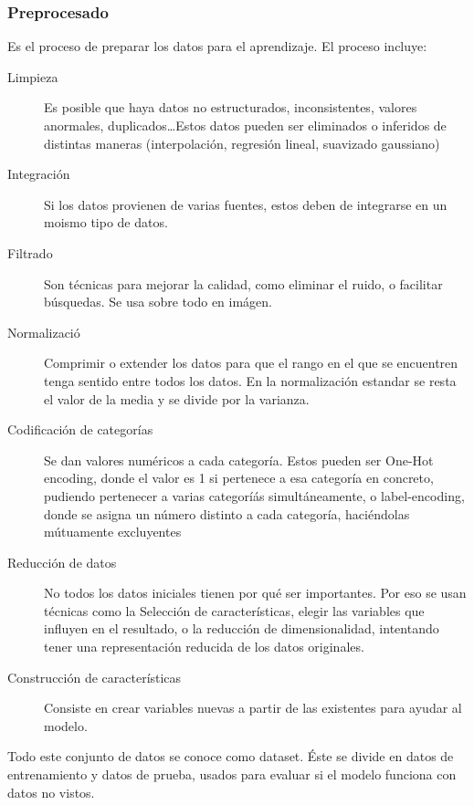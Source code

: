     \subsubsection{Preprocesado}
        Es el proceso de preparar los datos para el aprendizaje. El proceso incluye:
        \begin{description}
            \item[Limpieza] Es posible que haya datos no estructurados, inconsistentes, valores anormales, duplicados\dots Estos datos pueden ser eliminados o inferidos de distintas maneras (interpolación, regresión lineal, suavizado gaussiano)
            \item[Integración] Si los datos provienen de varias fuentes, estos deben de integrarse en un moismo tipo de datos.
            \item[Filtrado] Son técnicas para mejorar la calidad, como eliminar el ruido, o facilitar búsquedas. Se usa sobre todo en imágen.
            \item[Normalizació] Comprimir o extender los datos para que el rango en el que se encuentren tenga sentido entre todos los datos. En la normalización estandar se resta el valor de la media y se divide por la varianza.
            \item [Codificación de categorías] Se dan valores numéricos a cada categoría. Estos pueden ser One-Hot encoding, donde el valor es 1 si pertenece a esa categoría en concreto, pudiendo pertenecer a varias categoríás simultáneamente, o label-encoding, donde se asigna un número distinto a cada categoría, haciéndolas mútuamente excluyentes
            \item[Reducción de datos] No todos los datos iniciales tienen por qué ser importantes. Por eso se usan técnicas como la Selección de características, elegir las variables que influyen en el resultado, o la reducción de dimensionalidad, intentando tener una representación reducida de los datos originales.
            \item[Construcción de características] Consiste en crear variables nuevas a partir de las existentes para ayudar al modelo.
        \end{description}

        Todo este conjunto de datos se conoce como dataset. Éste se divide en datos de entrenamiento y datos de prueba, usados para evaluar si el modelo funciona con datos no vistos.


